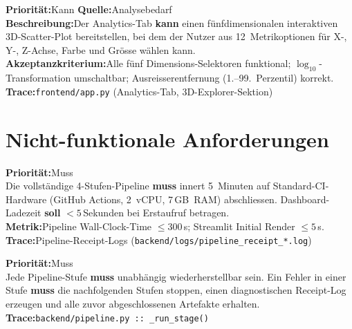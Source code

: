 \documentclass[11pt, a4paper, oneside, openany]{report}
\newcommand{\code}[1]{\texttt{\small\textcolor{DeepNavy}{#1}}}
\begin{document}
\vspace{6pt}

\begin{reqbox}
\textbf{Priorität:}\;Kann \quad \textbf{Quelle:}\;Analysebedarf \\[4pt]
\textbf{Beschreibung:}\;Der Analytics-Tab \textbf{kann} einen fünfdimensionalen interaktiven 3D-Scatter-Plot bereitstellen, bei dem der Nutzer aus 12~Metrikoptionen für X-, Y-, Z-Achse, Farbe und Grösse wählen kann. \\[4pt]
\textbf{Akzeptanzkriterium:}\;Alle fünf Dimensions-Selektoren funktional; $\log_{10}$-Transformation umschaltbar; Ausreisserentfernung (1.--99.~Perzentil) korrekt. \\[4pt]
\textbf{Trace:}\;\code{frontend/app.py} (Analytics-Tab, 3D-Explorer-Sektion)
\end{reqbox}

\section{Nicht-funktionale Anforderungen}
\label{sec:nfa}

\begin{reqbox}
\textbf{Priorität:}\;Muss \\[4pt]
Die vollständige 4-Stufen-Pipeline \textbf{muss} innert 5~Minuten auf Standard-CI-Hardware (GitHub Actions, 2~vCPU, 7\,GB~RAM) abschliessen. Dashboard-Ladezeit \textbf{soll} $< 5$\,Sekunden bei Erstaufruf betragen. \\[4pt]
\textbf{Metrik:}\;Pipeline Wall-Clock-Time $\leq 300$\,s; Streamlit Initial Render $\leq 5$\,s. \\[4pt]
\textbf{Trace:}\;Pipeline-Receipt-Logs (\code{backend/logs/pipeline\_receipt\_*.log})
\end{reqbox}

\vspace{6pt}

\begin{reqbox}
\textbf{Priorität:}\;Muss \\[4pt]
Jede Pipeline-Stufe \textbf{muss} unabhängig wiederherstellbar sein. Ein Fehler in einer Stufe \textbf{muss} die nachfolgenden Stufen stoppen, einen diagnostischen Receipt-Log erzeugen und alle zuvor abgeschlossenen Artefakte erhalten. \\[4pt]
\textbf{Trace:}\;\code{backend/pipeline.py :: \_run\_stage()}
\end{reqbox}
\end{document}
